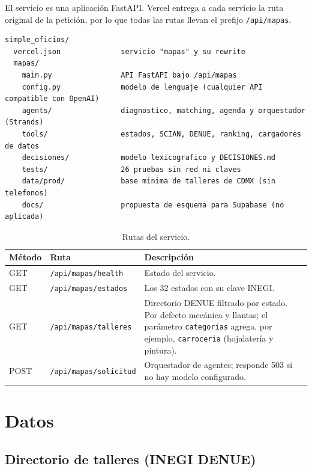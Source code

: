 \documentclass[11pt,a4paper]{article}
\newcommand{\code}[1]{\texttt{#1}}
\begin{document}
El servicio es una aplicación FastAPI. Vercel entrega a cada servicio la ruta original de la
petición, por lo que todas las rutas llevan el prefijo \code{/api/mapas}.

\begin{lstlisting}
simple_oficios/
  vercel.json              servicio "mapas" y su rewrite
  mapas/
    main.py                API FastAPI bajo /api/mapas
    config.py              modelo de lenguaje (cualquier API compatible con OpenAI)
    agents/                diagnostico, matching, agenda y orquestador (Strands)
    tools/                 estados, SCIAN, DENUE, ranking, cargadores de datos
    decisiones/            modelo lexicografico y DECISIONES.md
    tests/                 26 pruebas sin red ni claves
    data/prod/             base minima de talleres de CDMX (sin telefonos)
    docs/                  propuesta de esquema para Supabase (no aplicada)
\end{lstlisting}

\begin{table}[h]
\centering
\begin{tabularx}{\textwidth}{@{}l l Y@{}}
\toprule
Método & Ruta & Descripción \\
\midrule
GET  & \code{/api/mapas/health}    & Estado del servicio. \\
GET  & \code{/api/mapas/estados}   & Los 32 estados con su clave INEGI. \\
GET  & \code{/api/mapas/talleres}  & Directorio DENUE filtrado por estado. Por defecto mecánica y llantas; el parámetro \code{categorias} agrega, por ejemplo, \code{carroceria} (hojalatería y pintura). \\
POST & \code{/api/mapas/solicitud} & Orquestador de agentes; responde 503 si no hay modelo configurado. \\
\bottomrule
\end{tabularx}
\caption{Rutas del servicio.}
\end{table}

\section{Datos}

\subsection{Directorio de talleres (INEGI DENUE)}
\end{document}
